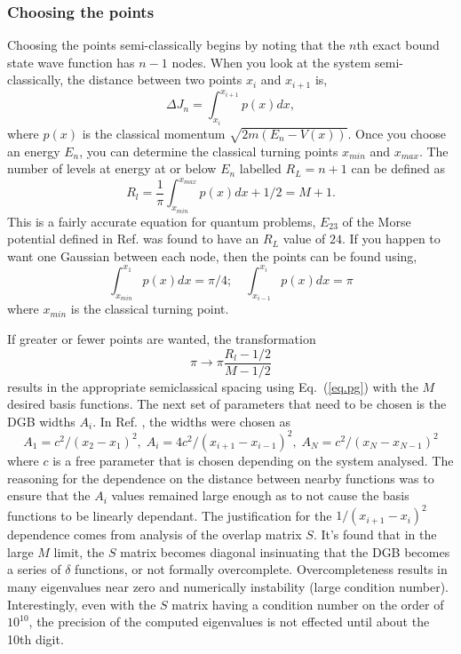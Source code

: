 \subsubsection{Choosing the points}
Choosing the points semi-classically begins by noting that the $n$th exact bound state wave function has $n-1$ nodes.  When you look at the system semi-classically, the distance between two points $x_i$ and $x_{i+1}$ is,
\begin{equation}
\label{eq.b3}
\Delta J_n=\int_{x_i}^{x_{i+1}}p\left(x\right)dx,
\end{equation}
where $p\left(x\right)$ is the classical momentum $\sqrt{2m\left(E_n-V\left(x\right)\right)}$. Once you choose an energy $E_n$, you can determine the classical turning points $x_{min}$ and $x_{max}$. The number of levels at energy at or below $E_n$ labelled $R_L=n+1$ can be defined as
 \begin{equation}
\label{eq.b5}
R_l=\dfrac{1}{\pi}
\int^{x_{max}}_{x_{min}}p\left(x\right) dx+1/2 =M+1. 
 \end{equation}
This is a fairly accurate equation for quantum problems, $E_{23}$ of the Morse potential defined in Ref.  was found to have an $R_L$ value of $24$.  If you happen to want one Gaussian between each node, then the points can be found using,
\begin{equation}
\label{eq.pg}
\int^{x_1}_{x_{min}}p\left(x\right) dx =\pi/4; \quad
 \int^{x_i}_{x_{i-1}}p\left(x\right) dx =\pi
 \end{equation}
where $x_{min}$ is the classical turning point. 
 
 
If greater or fewer points are wanted, the transformation 
 \begin{equation}
\label{eq.b6}
\pi \rightarrow \pi\dfrac{R_l-1/2}{M-1/2}
 \end{equation}  
 results in the appropriate semiclassical spacing using Eq.~(\ref{eq.pg}) with the $M$ desired basis functions.  The next set of parameters that need to be chosen is the DGB widths $A_i$.  In Ref. , the widths were chosen as
\begin{equation}\label{eq.ai}
A_1=c^2/\left(x_2-x_1\right)^2,\;A_i=4c^2/\left(x_{i+1}-x_{i-1}\right)^2,\;A_N=c^2/\left(x_N-x_{N-1}\right)^2
\end{equation}
where $c$ is a free parameter that is chosen depending on the system analysed.  The reasoning for the dependence on the distance between nearby functions was to ensure that the $A_i$ values remained large enough as to not cause the basis functions to be linearly dependant.  The justification for the $1/\left(x_{i+1}-x_{i}\right)^2$ dependence comes from analysis of the overlap matrix $S$. It's found that in the large $M$ limit, the $S$ matrix becomes diagonal insinuating that the DGB becomes a series of $\delta$ functions, or not formally overcomplete.  Overcompleteness results in many eigenvalues near zero and numerically instability (large condition number).  Interestingly, even with the $S$  matrix having a condition number on the order of $10^{10}$, the precision of the computed eigenvalues is not effected until about the 10th digit.

